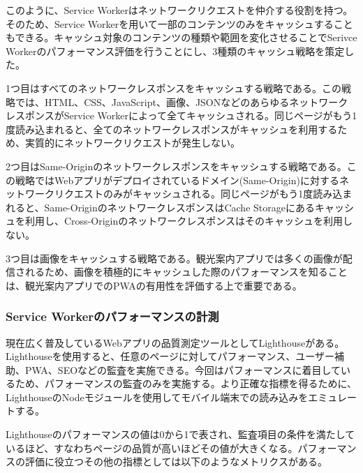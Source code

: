 このように、Service Workerはネットワークリクエストを仲介する役割を持つ。そのため、Service Workerを用いて一部のコンテンツのみをキャッシュすることもできる。キャッシュ対象のコンテンツの種類や範囲を変化させることでSerivce Workerのパフォーマンス評価を行うことにし、3種類のキャッシュ戦略を策定した。

1つ目はすべてのネットワークレスポンスをキャッシュする戦略である。この戦略では、HTML、CSS、JavaScript、画像、JSONなどのあらゆるネットワークレスポンスがService Workerによって全てキャッシュされる。同じページがもう1度読み込まれると、全てのネットワークレスポンスがキャッシュを利用するため、実質的にネットワークリクエストが発生しない。

2つ目はSame-Originのネットワークレスポンスをキャッシュする戦略である。この戦略ではWebアプリがデプロイされているドメイン(Same-Origin)に対するネットワークリクエストのみがキャッシュされる。同じページがもう1度読み込まれると、Same-OriginのネットワークレスポンスはCache Storageにあるキャッシュを利用し、Cross-Originのネットワークレスポンスはそのキャッシュを利用しない。

3つ目は画像をキャッシュする戦略である。観光案内アプリでは多くの画像が配信されるため、画像を積極的にキャッシュした際のパフォーマンスを知ることは、観光案内アプリでのPWAの有用性を評価する上で重要である。
\subsubsection{Service Workerのパフォーマンスの計測}
\label{subsubsection:Service Workerのパフォーマンスの計測}
現在広く普及しているWebアプリの品質測定ツールとしてLighthouseがある。Lighthouseを使用すると、任意のページに対してパフォーマンス、ユーザー補助、PWA、SEOなどの監査を実施できる。今回はパフォーマンスに着目しているため、パフォーマンスの監査のみを実施する。より正確な指標を得るために、LighthouseのNodeモジュールを使用してモバイル端末での読み込みをエミュレートする。

Lighthouseのパフォーマンスの値は0から1で表され、監査項目の条件を満たしているほど、すなわちページの品質が高いほどその値が大きくなる。パフォーマンスの評価に役立つその他の指標としては以下のようなメトリクスがある。

